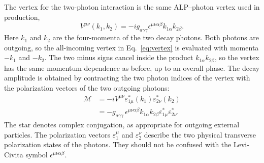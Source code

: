 \documentclass[12pt,a4paper]{article}
\begin{document}
The vertex for the two-photon interaction is the same ALP--photon vertex used
in production,
\begin{equation}
    V^{\mu\nu}(k_1,k_2)
    =
    -ig_{a\gamma\gamma}\epsilon^{\mu\nu\alpha\beta}
    k_{1\alpha}k_{2\beta}.
    \label{eq:decay_vertex_repeat}
\end{equation}
Here $k_1$ and $k_2$ are the four-momenta of the two decay photons. Both
photons are outgoing, so the all-incoming vertex in Eq.~\eqref{eq:vertex} is
evaluated with momenta $-k_1$ and $-k_2$. The two minus signs cancel inside
the product $k_{1\alpha}k_{2\beta}$, so the vertex has the same momentum
dependence as before, up to an overall phase. The decay amplitude is obtained
by contracting the two photon indices of the vertex with the polarization
vectors of the two outgoing photons:
\begin{align}
    \mathcal{M}
    &=
    -iV^{\mu\nu}
    \varepsilon^{*}_{1\mu}(k_1)
    \varepsilon^{*}_{2\nu}(k_2)
    \nonumber\\
    &=
    -g_{a\gamma\gamma}\,
    \epsilon^{\mu\nu\alpha\beta}
    k_{1\alpha}k_{2\beta}
    \varepsilon^{*}_{1\mu}
    \varepsilon^{*}_{2\nu}.
    \label{eq:decay_amp}
\end{align}
The star denotes complex conjugation, as appropriate for outgoing external
particles. The polarization vectors $\varepsilon_1^\mu$ and
$\varepsilon_2^\nu$ describe the two physical transverse polarization states
of the photons. They should not be confused with the Levi-Civita symbol
$\epsilon^{\mu\nu\alpha\beta}$.
\end{document}
